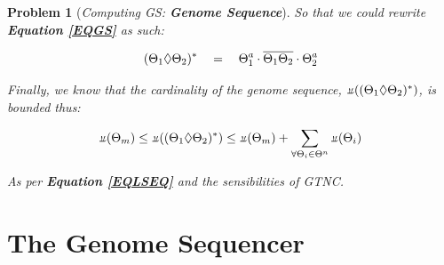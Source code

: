 \documentclass[a4paper, 18pt]{book} %
\newtheorem{prob}{Problem}
\newcommand{\invpi}{\rotatebox[origin=c]{180}{$\pi$}}
\begin{document}
\begin{prob}[\textit{Computing GS: \textbf{Genome Sequence}}]
So that we could rewrite \textbf{Equation \ref{EQGS}} as such:

\begin{equation}
\label{EQGS2}
(\Theta_1 \Diamond \Theta_2)^* \quad = \quad \Theta_1^a\cdot\overline{\Theta_1\Theta_2}\cdot\Theta_2^a\\\\
\end{equation}

Finally, we know that the cardinality of the genome sequence, $\invpi((\Theta_1 \Diamond \Theta_2)^*)$, is bounded thus:

\begin{equation}
\label{EQBOUNDGS}
\invpi(\Theta_m) \leq \invpi((\Theta_1 \Diamond \Theta_2)^*) \leq \invpi(\Theta_m) + \sum\limits_{\forall \Theta_i \in \Theta^n} \invpi(\Theta_i)
\end{equation}

As per \textbf{Equation  \ref{EQLSEQ}} and the sensibilities of GTNC\cite{Lutalo2024gtnc}.

\end{prob}

\section{The Genome Sequencer}
\label{SECGENSEQ}
\end{document}
